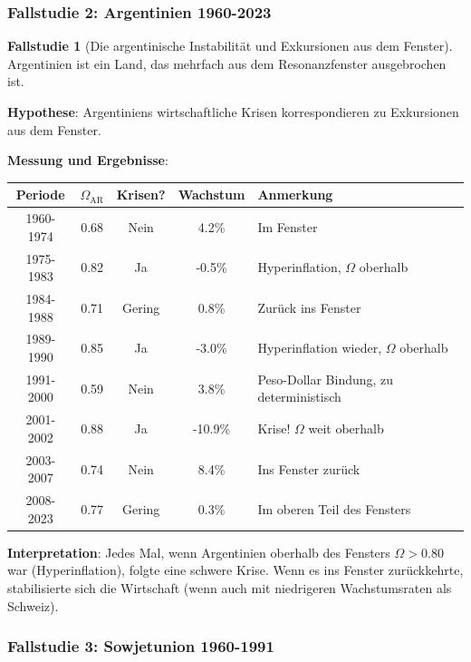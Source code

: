 \documentclass[a4paper,12pt,twoside]{report}
\theoremstyle{definition}
\newtheorem{fallstudie}{Fallstudie}
\begin{document}
\subsubsection{Fallstudie 2: Argentinien 1960-2023}

\begin{fallstudie}[Die argentinische Instabilität und Exkursionen aus dem Fenster]

Argentinien ist ein Land, das mehrfach aus dem Resonanzfenster ausgebrochen ist.

\textbf{Hypothese}: Argentiniens wirtschaftliche Krisen korrespondieren zu Exkursionen aus dem Fenster.

\textbf{Messung und Ergebnisse}:

\begin{table}[h]
\centering
\begin{tabular}{ccccl}
\hline
Periode & $\Omega_{\text{AR}}$ & Krisen? & Wachstum & Anmerkung \\
\hline
1960-1974 & 0.68 & Nein & 4.2\% & Im Fenster \\
1975-1983 & 0.82 & Ja & -0.5\% & Hyperinflation, $\Omega$ oberhalb \\
1984-1988 & 0.71 & Gering & 0.8\% & Zurück ins Fenster \\
1989-1990 & 0.85 & Ja & -3.0\% & Hyperinflation wieder, $\Omega$ oberhalb \\
1991-2000 & 0.59 & Nein & 3.8\% & Peso-Dollar Bindung, zu deterministisch \\
2001-2002 & 0.88 & Ja & -10.9\% & Krise! $\Omega$ weit oberhalb \\
2003-2007 & 0.74 & Nein & 8.4\% & Ins Fenster zurück \\
2008-2023 & 0.77 & Gering & 0.3\% & Im oberen Teil des Fensters \\
\hline
\end{tabular}
\end{table}

\textbf{Interpretation}: Jedes Mal, wenn Argentinien oberhalb des Fensters $\Omega > 0.80$ war (Hyperinflation), folgte eine schwere Krise. Wenn es ins Fenster zurückkehrte, stabilisierte sich die Wirtschaft (wenn auch mit niedrigeren Wachstumsraten als Schweiz).

\end{fallstudie}

\subsubsection{Fallstudie 3: Sowjetunion 1960-1991}
\end{document}
